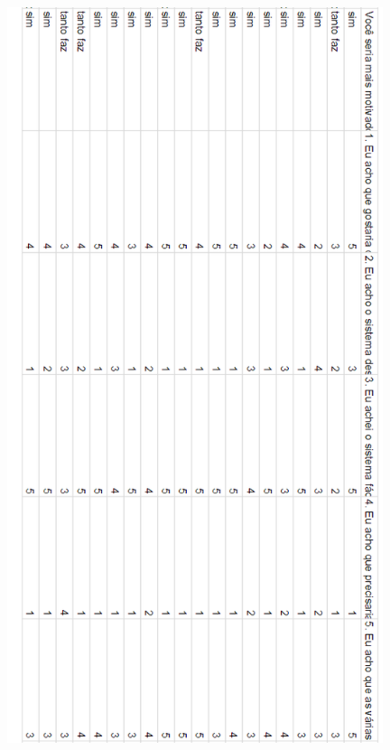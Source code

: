 \documentclass[
	12pt,				%
	openany,			%
	oneside,			%
	a4paper,			%
	english,			%
	french,				%
	spanish,			%
	brazil				%
	]{abntex2}
\begin{document}
\begin{apendicesenv}
\begin{figure}[H]
\includegraphics[width=11cm]{figuras/7.png}
\par

\end{figure}

\begin{figure}[H]
    \centering


\end{figure}
\end{apendicesenv}
\end{document}
